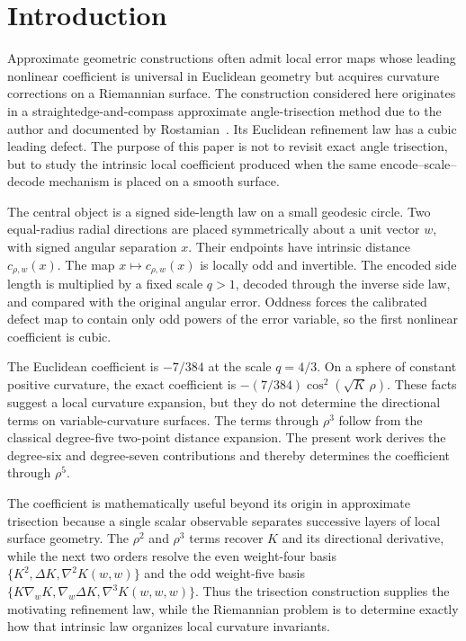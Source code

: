 \documentclass[11pt]{amsart}
\numberwithin{equation}{section}
\theoremstyle{remark}
\begin{document}
\section{Introduction}

Approximate geometric constructions often admit local error maps whose leading nonlinear coefficient is universal in Euclidean geometry but acquires curvature corrections on a Riemannian surface.  The construction considered here originates in a straightedge-and-compass approximate angle-trisection method due to the author and documented by Rostamian~\cite{Rostamian}.  Its Euclidean refinement law has a cubic leading defect.  The purpose of this paper is not to revisit exact angle trisection, but to study the intrinsic local coefficient produced when the same encode--scale--decode mechanism is placed on a smooth surface.

The central object is a signed side-length law on a small geodesic circle.  Two equal-radius radial directions are placed symmetrically about a unit vector $w$, with signed angular separation $x$.  Their endpoints have intrinsic distance $c_{\rho,w}(x)$.  The map $x\mapsto c_{\rho,w}(x)$ is locally odd and invertible.  The encoded side length is multiplied by a fixed scale $q>1$, decoded through the inverse side law, and compared with the original angular error.  Oddness forces the calibrated defect map to contain only odd powers of the error variable, so the first nonlinear coefficient is cubic.

The Euclidean coefficient is $-7/384$ at the scale $q=4/3$.  On a sphere of constant positive curvature, the exact coefficient is $-(7/384)\cos^2(\sqrt K\,\rho)$.  These facts suggest a local curvature expansion, but they do not determine the directional terms on variable-curvature surfaces.  The terms through $\rho^3$ follow from the classical degree-five two-point distance expansion.  The present work derives the degree-six and degree-seven contributions and thereby determines the coefficient through $\rho^5$.

The coefficient is mathematically useful beyond its origin in approximate trisection because a single scalar observable separates successive layers of local surface geometry.  The $\rho^2$ and $\rho^3$ terms recover $K$ and its directional derivative, while the next two orders resolve the even weight-four basis $\{K^2,\Delta K,\nabla^2K(w,w)\}$ and the odd weight-five basis $\{K\nabla_wK,\nabla_w\Delta K,\nabla^3K(w,w,w)\}$.  Thus the trisection construction supplies the motivating refinement law, while the Riemannian problem is to determine exactly how that intrinsic law organizes local curvature invariants.
\end{document}
